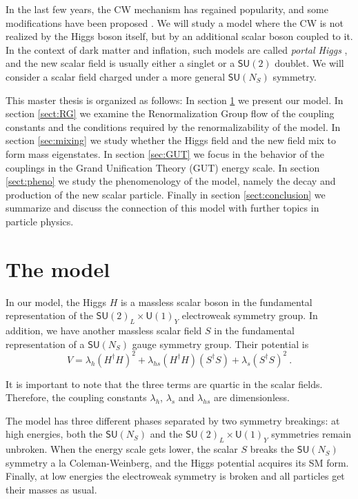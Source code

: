 \documentclass[aps,prd,preprintnumbers,nofootinbibn,twocolumn]{revtex4}
\begin{document}
In the last few years, the CW mechanism has regained popularity, and some modifications have been proposed \cite{Dermisek:2013pta, Hill:2014mqa, Antipin:2015kgh}. We will study a model where the CW is not realized by the Higgs boson itself, but by an additional scalar boson coupled to it. In the context of dark matter and inflation, such models are called \textit{portal Higgs} \cite{Patt:2006fw, Englert:2013gz}, and the new scalar field is usually either a singlet or a $\mathsf{SU}(2)$ doublet. We will consider a scalar field charged under a more general $\mathsf{SU}(N_S)$ symmetry.

This master thesis is organized as follows: In section \ref{sect:model} we present our model. In section \ref{sect:RG} we examine the Renormalization Group flow of the coupling constants and the conditions required by the renormalizability of the model. In section \ref{sec:mixing} we study whether the Higgs field and the new field mix to form mass eigenstates. In section \ref{sec:GUT} we focus in the behavior of the couplings in the Grand Unification Theory (GUT) energy scale. In section \ref{sect:pheno} we study the phenomenology of the model, namely the decay and production of the new scalar particle. Finally in section \ref{sect:conclusion} we summarize and discuss the connection of this model with further topics in particle physics.

\section{The model} \label{sect:model}
In our model, the Higgs $H$ is a massless scalar boson in the fundamental representation of the $\mathsf{SU}(2)_L \times \mathsf{U}(1)_Y$ electroweak symmetry group. In addition, we have another massless scalar field $S$ in the fundamental representation of a $\mathsf{SU}(N_S)$ gauge symmetry group. Their potential is
\begin{equation}\label{eq:CWpotential}
V = \lambda_h (H^\dagger H)^2 + \lambda_{hs} (H^\dagger H) (S^\dagger S) + \lambda_s (S^\dagger S)^2\ .
\end{equation}

It is important to note that the three terms are quartic in the scalar fields. Therefore, the coupling constants $\lambda_h$, $\lambda_s$ and $\lambda_{hs}$ are dimensionless.

The model has three different phases separated by two symmetry breakings: at high energies, both the $\mathsf{SU}(N_S)$ and the  $\mathsf{SU}(2)_L \times \mathsf{U}(1)_Y$ symmetries remain unbroken. When the energy scale gets lower, the scalar $S$ breaks the $\mathsf{SU}(N_S)$ symmetry a la Coleman-Weinberg, and the Higgs potential acquires its SM form. Finally, at low energies the electroweak symmetry is broken and all particles get their masses as usual.
\end{document}
